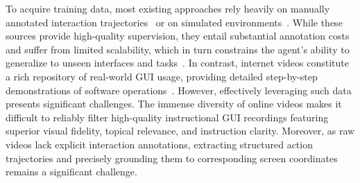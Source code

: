 \documentclass{llmxive}
\begin{document}
To acquire training data, most existing approaches rely heavily on manually annotated interaction trajectories~\citep{deka2017rico, rawles2023androidinthewild} or on simulated environments~\citep{shvo2021appbuddy, lee2024benchmarking}. While these sources provide high-quality supervision, they entail substantial annotation costs and suffer from limited scalability, which in turn constrains the agent’s ability to generalize to unseen interfaces and tasks~\citep{gao2024multi}. In contrast, internet videos constitute a rich repository of real-world GUI usage, providing detailed step-by-step demonstrations of software operations~\citep{zhang2025tongui}. However, effectively leveraging such data presents significant challenges. 
The immense diversity of online videos makes it difficult to reliably filter high-quality instructional GUI recordings featuring superior visual fidelity, topical relevance, and instruction clarity. Moreover, as raw videos lack explicit interaction annotations, extracting structured action trajectories and precisely grounding them to corresponding screen coordinates remains a significant challenge.
\end{document}
